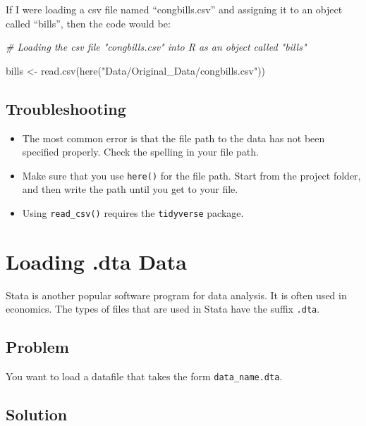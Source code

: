 \documentclass[
]{book}
\newenvironment{Shaded}{\begin{snugshade}}{\end{snugshade}}
\newcommand{\CommentTok}[1]{\textcolor[rgb]{0.56,0.35,0.01}{\textit{#1}}}
\newcommand{\FunctionTok}[1]{\textcolor[rgb]{0.00,0.00,0.00}{#1}}
\newcommand{\NormalTok}[1]{#1}
\newcommand{\OtherTok}[1]{\textcolor[rgb]{0.56,0.35,0.01}{#1}}
\newcommand{\StringTok}[1]{\textcolor[rgb]{0.31,0.60,0.02}{#1}}
\providecommand{\tightlist}{%
  \setlength{\itemsep}{0pt}\setlength{\parskip}{0pt}}
\begin{document}
If I were loading a csv file named ``congbills.csv'' and assigning it to an object called ``bills'', then the code would be:

\begin{Shaded}
\begin{Highlighting}[]
\CommentTok{\# Loading the csv file "congbills.csv" into R as an object called "bills"}

\NormalTok{bills }\OtherTok{\textless{}{-}} \FunctionTok{read.csv}\NormalTok{(}\FunctionTok{here}\NormalTok{(}\StringTok{"Data/Original\_Data/congbills.csv"}\NormalTok{))}
\end{Highlighting}
\end{Shaded}

\hypertarget{troubleshooting-7}{%
\subsection{Troubleshooting}\label{troubleshooting-7}}

\begin{itemize}
\tightlist
\item
  The most common error is that the file path to the data has not been specified properly. Check the spelling in your file path.
\item
  Make sure that you use \texttt{here()} for the file path. Start from the project folder, and then write the path until you get to your file.
\item
  Using \texttt{read\_csv()} requires the \texttt{tidyverse} package.
\end{itemize}

\hypertarget{dta-load}{%
\section{Loading .dta Data}\label{dta-load}}

Stata is another popular software program for data analysis. It is often used in economics. The types of files that are used in Stata have the suffix \texttt{.dta}.

\hypertarget{problem-10}{%
\subsection{Problem}\label{problem-10}}

You want to load a datafile that takes the form \texttt{data\_name.dta}.

\hypertarget{solution-10}{%
\subsection{Solution}\label{solution-10}}
\end{document}
